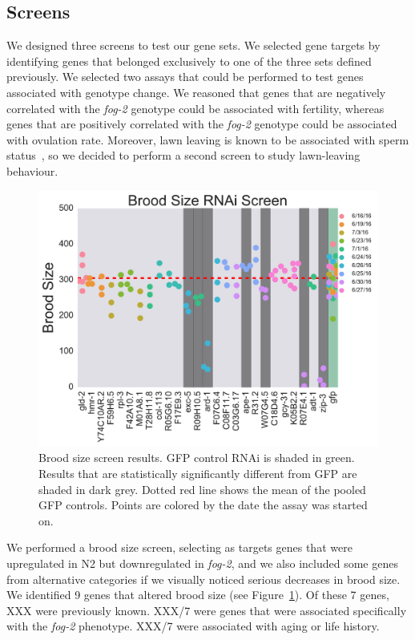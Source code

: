 \documentclass[9pt,twocolumn,twoside]{gsag3jnl}
\newcommand{\fog}{\emph{fog-2}}
\begin{document}
\subsection*{Screens}
\label{subs:Screens}

We designed three screens to test our gene sets. We selected gene targets by identifying genes that belonged exclusively to one of the three sets defined previously. We selected two assays that could be performed to test genes associated with genotype change. We reasoned that genes that are negatively correlated with the \fog{} genotype could be associated with fertility, whereas genes that are positively correlated with the \fog{} genotype could be associated with ovulation rate. Moreover, lawn leaving is known to be associated with sperm status~\citep{}, so we decided to perform a second screen to study lawn-leaving behaviour.

\begin{figure}[htbp]
\renewcommand{\familydefault}{\sfdefault}\normalfont{}
\centering
\includegraphics[width=\linewidth]{../output/figs/final_figs/rnai_brood_assay_results.pdf}
\caption{Brood size screen results. GFP control RNAi is shaded in green. Results that are statistically significantly different from GFP are shaded in dark grey. Dotted red line shows the mean of the pooled GFP controls. Points are colored by the date the assay was started on.
}%
\label{fig:broodassay}
\end{figure}

We performed a brood size screen, selecting as targets genes that were upregulated in N2 but downregulated in \fog{}, and we also included some genes from alternative categories if we visually noticed serious decreases in brood size. We identified 9 genes that altered brood size (see Figure~\ref{fig:broodassay}). Of these 7 genes, XXX were previously known. XXX/7 were genes that were associated specifically with the \fog{} phenotype. XXX/7 were associated with aging or life history.
\end{document}
